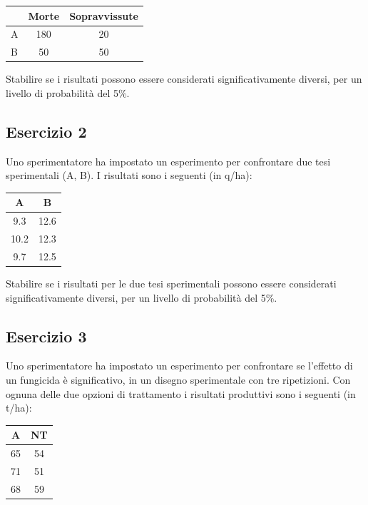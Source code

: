 \documentclass[a4paper,12pt,oneside]{book}
\begin{document}
\begin{longtable}[]{@{}lcc@{}}
\toprule()
& Morte & Sopravvissute \\
\midrule()
\endhead
A & 180 & 20 \\
B & 50 & 50 \\
\bottomrule()
\end{longtable}

Stabilire se i risultati possono essere considerati significativamente diversi, per un livello di probabilità del 5\%.

\hypertarget{esercizio-2-4}{%
\subsection{Esercizio 2}\label{esercizio-2-4}}

Uno sperimentatore ha impostato un esperimento per confrontare due tesi sperimentali (A, B). I risultati sono i seguenti (in q/ha):

\begin{longtable}[]{@{}cc@{}}
\toprule()
A & B \\
\midrule()
\endhead
9.3 & 12.6 \\
10.2 & 12.3 \\
9.7 & 12.5 \\
\bottomrule()
\end{longtable}

Stabilire se i risultati per le due tesi sperimentali possono essere considerati significativamente diversi, per un livello di probabilità del 5\%.

\hypertarget{esercizio-3-4}{%
\subsection{Esercizio 3}\label{esercizio-3-4}}

Uno sperimentatore ha impostato un esperimento per confrontare se l'effetto di un fungicida è significativo, in un disegno sperimentale con tre ripetizioni. Con ognuna delle due opzioni di trattamento i risultati produttivi sono i seguenti (in t/ha):

\begin{longtable}[]{@{}cc@{}}
\toprule()
A & NT \\
\midrule()
\endhead
65 & 54 \\
71 & 51 \\
68 & 59 \\
\bottomrule()
\end{longtable}
\end{document}
